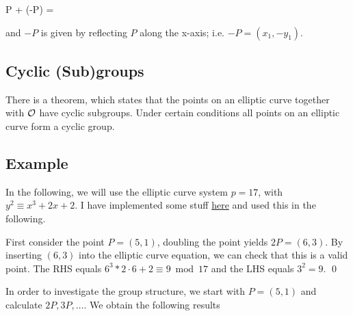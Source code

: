 \bee
P + (-P) = \Oc
\eee

and $-P$ is given by reflecting $P$ along the x-axis; i.e. $-P = (x_1, -y_1)$.

\subsection{Cyclic (Sub)groups}

There is a theorem, which states that the points on an elliptic curve together with $\mathcal{O}$ have cyclic subgroups. Under certain conditions all points on an elliptic curve form a cyclic group.

\subsection{Example}

In the following, we will use the elliptic curve system $p = 17$, with $y^2 \equiv x^3 + 2x + 2$. I have implemented some stuff \href{https://github.com/ClemensFMN/JuliaStuff/blob/master/elliptic_curve_group.jl}{here} and used this in the following.

First consider the point $P = (5,1)$, doubling the point yields $2P = (6,3)$. By inserting $(6,3)$ into the elliptic curve equation, we can check that this is a valid point. The RHS equals $6^3 * 2\cdot 6 + 2 \equiv 9 \bmod 17$ and the LHS equals $3^2 = 9$. \qed

In order to investigate the group structure, we start with $P = (5,1)$ and calculate $2P, 3P, \ldots$. We obtain the following results



